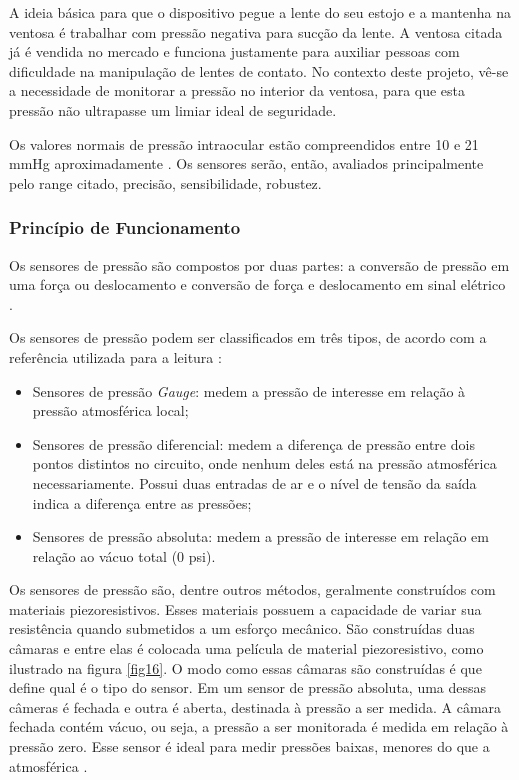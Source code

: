 \begin{anexosenv}
A ideia básica para que o dispositivo pegue a lente do seu estojo e a mantenha na ventosa é trabalhar com pressão negativa para sucção da lente. A ventosa citada já é vendida no mercado e funciona justamente para auxiliar pessoas com dificuldade na manipulação de lentes de contato. No contexto deste projeto, vê-se a necessidade de monitorar a pressão no interior da ventosa, para que esta pressão não ultrapasse um limiar ideal de seguridade.

Os valores normais de pressão intraocular estão compreendidos entre 10 e 21 mmHg aproximadamente \cite{andre}. Os sensores serão, então, avaliados principalmente pelo range citado, precisão, sensibilidade, robustez.

\subsubsection[Princípio de Funcionamento]{Princípio de Funcionamento}

Os sensores de pressão são compostos por duas partes: a conversão de pressão em uma força ou deslocamento e conversão de força e deslocamento em sinal elétrico \cite{geomar}.

Os sensores de pressão podem ser classificados em três tipos, de acordo com a referência utilizada para a leitura \cite{patsko}:
\begin{itemize}
\item Sensores de pressão \textit{Gauge}: medem a pressão de interesse em relação à pressão atmosférica local;
\item Sensores de pressão diferencial: medem a diferença de pressão entre dois pontos distintos no circuito, onde nenhum deles está na pressão atmosférica necessariamente. Possui duas entradas de ar e o nível de tensão da saída indica a diferença entre as pressões;
\item Sensores de pressão absoluta: medem a pressão de interesse em relação em relação ao vácuo total (0 psi).
\end{itemize}

Os sensores de pressão são, dentre outros métodos, geralmente construídos com materiais piezoresistivos. Esses materiais possuem a capacidade de variar sua resistência  quando submetidos a um esforço mecânico. São construídas duas câmaras e entre elas é colocada uma película de material piezoresistivo, como ilustrado na figura \ref{fig16}. O modo como essas câmaras são construídas é que define qual é o tipo do sensor. Em um sensor de pressão absoluta, uma dessas câmeras é fechada e outra é aberta, destinada à pressão a ser medida. A câmara fechada contém vácuo, ou seja, a pressão a ser monitorada é medida em relação à pressão zero. Esse sensor é ideal para medir pressões baixas, menores do que a atmosférica \cite{patsko}.


\end{anexosenv}
